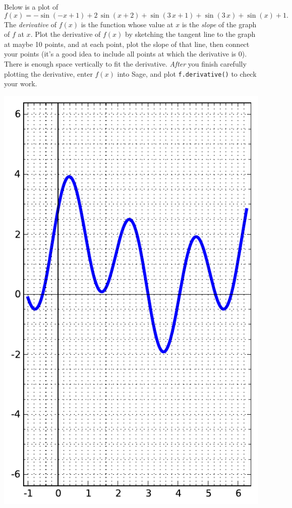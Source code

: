 Below is a plot of $$f(x)=-\sin\left(-x + 1\right) + 2 \, \sin\left(x + 2\right) + \sin\left(3 \, x + 1\right) + \sin\left(3 \, x\right) + \sin\left(x\right) + 1.$$  The {\em \color{red}derivative} of $f(x)$ is the function whose value at $x$ is the {\em slope} of the graph of $f$ at $x$.  Plot the derivative of $f(x)$ by sketching the tangent line to the graph at maybe 10 points, and at each point, plot the slope of that line, then connect your points (it's a good idea to include all points at which the derivative is 0).  There is enough space vertically to fit the derivative.  {\em After} you finish carefully plotting the derivative, enter $f(x)$ into Sage, and plot {\color{blue}\verb|f.derivative()|} to check your work.
\begin{center}\includegraphics{functions/94.pdf}\end{center}\newpage

